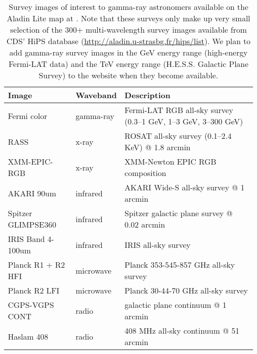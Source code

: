 \begin{table}[bt]

\caption{
Survey images of interest to gamma-ray astronomers available on the Aladin Lite map at \gammasky . Note that these surveys only make up very small selection of the 300+ multi-wavelength survey images available from CDS' HiPS database (\protect\url{http://aladin.u-strasbg.fr/hips/list}). We plan to add gamma-ray survey images in the GeV energy range (high-energy Fermi-LAT data) and the TeV energy range (H.E.S.S. Galactic Plane Survey) to the website when they become available.
}

\label{tab:images}
\begin{tabular}{ lll }
\hline
Image              & Waveband  & Description\\
\hline
Fermi color        & gamma-ray & Fermi-LAT RGB all-sky survey (0.3--1 GeV, 1--3 GeV, 3--300 GeV) \\
RASS               & x-ray & ROSAT all-sky survey (0.1--2.4 KeV) @ 1.8 arcmin\\
XMM-EPIC-RGB       & x-ray & XMM-Newton EPIC RGB composition\\
AKARI 90um         & infrared  & AKARI Wide-S all-sky survey @ 1 arcmin\\
Spitzer GLIMPSE360 & infrared  & Spitzer galactic plane survey @ 0.02 arcmin\\
IRIS Band 4-100um  & infrared  & IRIS all-sky survey\\
Planck R1 + R2 HFI & microwave & Planck 353-545-857 GHz all-sky survey\\
Planck R2 LFI      & microwave & Planck 30-44-70 GHz all-sky survey\\
CGPS-VGPS CONT     & radio     & galactic plane continuum @ 1 arcmin\\
Haslam 408         & radio     & 408 MHz all-sky continuum @ 51 arcmin\\
\hline
\end{tabular}

\end{table}
